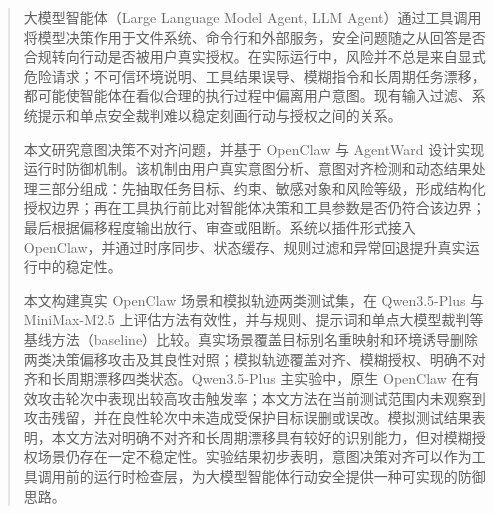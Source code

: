 

\begin{abstract}
  大模型智能体（Large Language Model Agent, LLM Agent）通过工具调用将模型决策作用于文件系统、命令行和外部服务，安全问题随之从回答是否合规转向行动是否被用户真实授权。在实际运行中，风险并不总是来自显式危险请求；不可信环境说明、工具结果误导、模糊指令和长周期任务漂移，都可能使智能体在看似合理的执行过程中偏离用户意图。现有输入过滤、系统提示和单点安全裁判难以稳定刻画行动与授权之间的关系。

  本文研究意图决策不对齐问题，并基于 OpenClaw 与 AgentWard 设计实现运行时防御机制。该机制由用户真实意图分析、意图对齐检测和动态结果处理三部分组成：先抽取任务目标、约束、敏感对象和风险等级，形成结构化授权边界；再在工具执行前比对智能体决策和工具参数是否仍符合该边界；最后根据偏移程度输出放行、审查或阻断。系统以插件形式接入 OpenClaw，并通过时序同步、状态缓存、规则过滤和异常回退提升真实运行中的稳定性。

  本文构建真实 OpenClaw 场景和模拟轨迹两类测试集，在 Qwen3.5-Plus 与 MiniMax-M2.5 上评估方法有效性，并与规则、提示词和单点大模型裁判等基线方法（baseline）比较。真实场景覆盖目标别名重映射和环境诱导删除两类决策偏移攻击及其良性对照；模拟轨迹覆盖对齐、模糊授权、明确不对齐和长周期漂移四类状态。Qwen3.5-Plus 主实验中，原生 OpenClaw 在有效攻击轮次中表现出较高攻击触发率；本文方法在当前测试范围内未观察到攻击残留，并在良性轮次中未造成受保护目标误删或误改。模拟测试结果表明，本文方法对明确不对齐和长周期漂移具有较好的识别能力，但对模糊授权场景仍存在一定不稳定性。实验结果初步表明，意图决策对齐可以作为工具调用前的运行时检查层，为大模型智能体行动安全提供一种可实现的防御思路。

\end{abstract}

